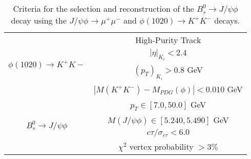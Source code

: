 {\begin{table}[!htp]
\begin{center}
\begin{tabular}{cc}
				\multirow{4}{*}{$\phi(1020) \to K^{+}K{-}$} & High-Purity Track                                                                                                                                                                                                       \\ \cline{2-2} 
				& $|\eta|_{K_i} < 2.4$                                                                                                                                                                                                          \\ \cline{2-2} 
				& $(p_T)_{K_i} > 0.8$ GeV                                                                                                                                                                                                         \\ \cline{2-2} 
				& $|M(K^{+}K^{-}) - M_{PDG}(\phi)| <  0.010$ GeV                                                                                                                                                                          \\ \hline
				\multirow{4}{*}{$B^0_s \to J/\psi \phi$}    & $p_T \in [7.0, 50.0]$ GeV                                                                                                                                                                                               \\ \cline{2-2} 
				& $M(J/\psi \phi) \in [5.240, 5.490] $ GeV                                                                                                                                                                                \\ \cline{2-2} 
				& $c\tau / \sigma_{c\tau}< 6.0 $                                                                                                                                                                                          \\ \cline{2-2} 
				& $\chi^2$ vertex probability $ > 3 \%$                                                                                                                                                                         \\ \hline
			\end{tabular}
			
		\end{center}
	\caption{Criteria for the selection and reconstruction of the $B^0_s \to J/\psi \phi$ decay using the $J/\psi \phi \to \mu^{+}\mu^{-}$ and $\phi(1020) \to K^{+}K^{-}$ decays.}
	\label{table:sel_criteria}
	\end{table}

}
